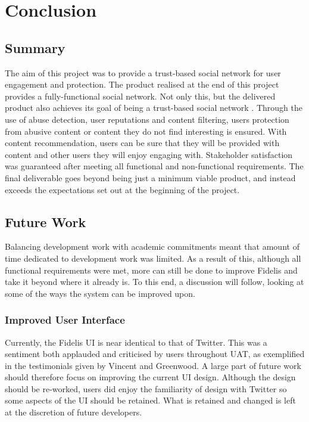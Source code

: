 \chapter{Conclusion}
\label{Chapter:Conclusion}

\section{Summary}
The aim of this project was to provide a trust-based social network for user engagement and protection. The product realised at the end of this project provides a fully-functional social network. Not only this, but the delivered product also achieves its goal of being a trust-based social network . Through the use of abuse detection, user reputations and content filtering, users protection from abusive content or content they do not find interesting is ensured. With content recommendation, users can be sure that they will be provided with content and other users they will enjoy engaging with. Stakeholder satisfaction was guaranteed after meeting all functional and non-functional requirements. The final deliverable goes beyond being just a minimum viable product, and instead exceeds the expectations set out at the beginning of the project.

\section{Future Work}
Balancing development work with academic commitments meant that amount of time dedicated to development work was limited. As a result of this, although all functional requirements were met, more can still be done to improve Fidelis and take it beyond where it already is. To this end, a discussion will follow, looking at some of the ways the system can be improved upon.

\subsection{Improved User Interface}
Currently, the Fidelis UI is near identical to that of Twitter. This was a sentiment both applauded and criticised by users throughout UAT, as exemplified in the testimonials given by Vincent and Greenwood. A large part of future work should therefore focus on improving the current UI design. Although the design should be re-worked, users did enjoy the familiarity of design with Twitter so some aspects of the UI should be retained. What is retained and changed is left at the discretion of future developers.

